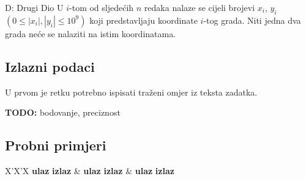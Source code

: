 \begin{statement}[
  timelimit=1 s,
  memorylimit=512 MiB,
]{D: Drugi Dio}
U $i$-tom od sljedećih $n$ redaka nalaze se cijeli brojevi $x_i$, $y_i$
$(0 \le |x_i|, |y_i| \le 10^9)$ koji predstavljaju koordinate $i$-tog
grada. Niti jedna dva grada neće se nalaziti na istim koordinatama.

\subsection*{Izlazni podaci}
U prvom je retku potrebno ispisati traženi omjer iz teksta zadatka.

  \textbf{TODO: } bodovanje, preciznost

\subsection*{Probni primjeri}
\begin{tabularx}{\textwidth}{X'X'X}
  \textbf{ulaz}
  \linespread{1}{}
  \textbf{izlaz}
  \linespread{1}{} &
  \textbf{ulaz}
  \linespread{1}{}
  \textbf{izlaz}
  \linespread{1}{} &
  \textbf{ulaz}
  \linespread{1}{}
  \textbf{izlaz}
  \linespread{1}{}
\end{tabularx}

\end{statement}

